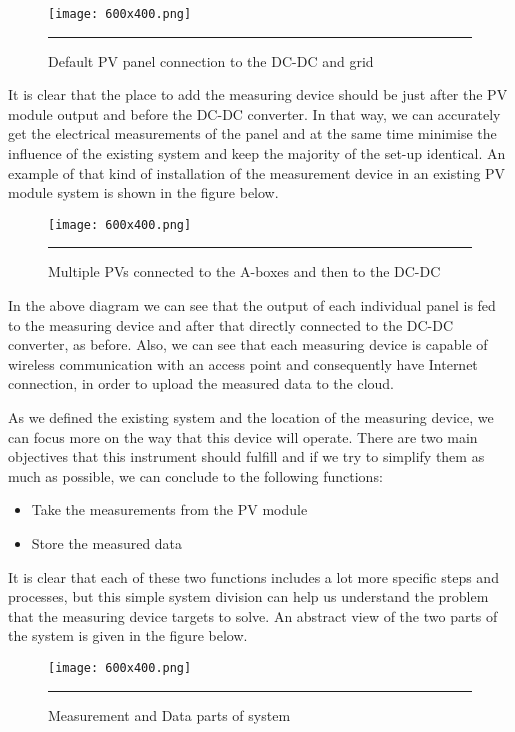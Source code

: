 \begin{figure}[htbp]
	\centering
		\texttt{[image: 600x400.png]}
		\rule{35em}{0.5pt}
	\caption[PV_to_DCDC]{Default PV panel connection to the DC-DC and grid}
	\label{fig:PV_to_DCDC}
\end{figure}
 
 It is clear that the place to add the measuring device should be just after the PV module output and before the DC-DC converter. In that way, we can accurately get the electrical measurements of the panel and at the same time minimise the influence of the existing system and keep the majority of the set-up identical. An example of that kind of  installation of the measurement device in an existing PV module system is shown in the figure below.
 
\begin{figure}[htbp]
	\centering
		\texttt{[image: 600x400.png]}
		\rule{35em}{0.5pt}
	\caption[PV_to_Aboxes_to_DCDC]{Multiple PVs connected to the A-boxes and then to the DC-DC}
	\label{fig:PV_to_Aboxes_to_DCDC}
\end{figure}

 In the above diagram we can see that the output of each individual panel is fed to the measuring device and after that directly connected to the DC-DC converter, as before. Also, we can see that each measuring device is capable of wireless communication with an access point and consequently have Internet connection, in order to upload the measured data to the cloud.
 
 As we defined the existing system and the location of the measuring device, we can focus more on the way that this device will operate. There are two main objectives that this instrument should fulfill and if we try to simplify them as much as possible, we can conclude to the following functions:
 
\begin{itemize}
 \item Take the measurements from the PV module
 \item Store the measured data
\end{itemize}
 
It is clear that each of these two functions includes a lot more specific steps and processes, but this simple system division can help us understand the problem that the measuring device targets to solve. An abstract view of the two parts of the system is given in the figure below.

\begin{figure}[htbp]
	\centering
		\texttt{[image: 600x400.png]}
		\rule{35em}{0.5pt}
	\caption[Measur_Data_parts]{Measurement and Data parts of system}
	\label{fig:Measur_Data_parts}
\end{figure}

